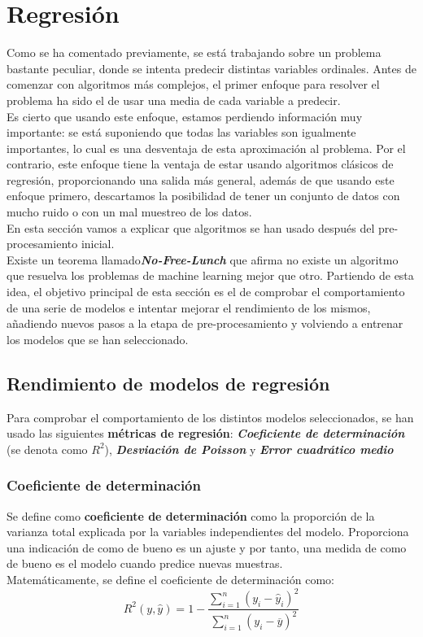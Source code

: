 \chapter{ Regresión}
\label{sec:algoritmos}
Como se ha comentado previamente, se está trabajando sobre  un problema bastante peculiar, donde se intenta predecir distintas variables ordinales. Antes de comenzar con algoritmos más complejos, el primer enfoque para resolver el problema ha sido el de usar una media de cada variable a predecir. \\
Es cierto que usando este enfoque, estamos perdiendo información muy importante:  se está suponiendo que todas las variables son igualmente importantes, lo cual es una desventaja de esta aproximación al problema.
Por el contrario, este enfoque tiene la ventaja de estar usando algoritmos clásicos de regresión, proporcionando una salida más general, además de que usando este enfoque primero, descartamos la posibilidad de tener un conjunto de datos con mucho ruido o con un mal muestreo de los datos.\\
\linebreak
En esta sección vamos a explicar que algoritmos se han usado después del pre-procesamiento inicial.\\
Existe un teorema llamado\textbf{\textit{No-Free-Lunch}} que afirma no existe un algoritmo que resuelva los problemas de machine learning mejor que otro. Partiendo de esta idea, el objetivo principal de esta sección es el de comprobar el comportamiento de una serie de modelos e intentar mejorar el rendimiento de los mismos, añadiendo nuevos pasos a la etapa de pre-procesamiento y volviendo a entrenar los modelos que se han seleccionado. \\
\linebreak
\section{Rendimiento de modelos de regresión}
Para comprobar el comportamiento de los distintos modelos seleccionados, se han usado las siguientes \textbf{métricas de regresión}: \textit{\textbf{Coeficiente de determinación}} (se denota como $R^2$), \textit{\textbf{Desviación de Poisson}} y \textit{\textbf{Error cuadrático medio}}
\subsection{Coeficiente de determinación}
Se define como \textbf{coeficiente de determinación} como la proporción de la varianza total explicada por la variables independientes del modelo. Proporciona una indicación de como de bueno es un ajuste y por tanto, una medida de como de bueno es el modelo cuando predice nuevas muestras.\\
\linebreak
Matemáticamente, se define el coeficiente de determinación como:
\[
	R^2 (y, \hat{y}) = 1 - \frac{\sum_{i=1}^{n}(y_i - \hat{y}_i)^2}    {\sum_{i=1}^{n} (y_i - \overline{y})^2}
\]

